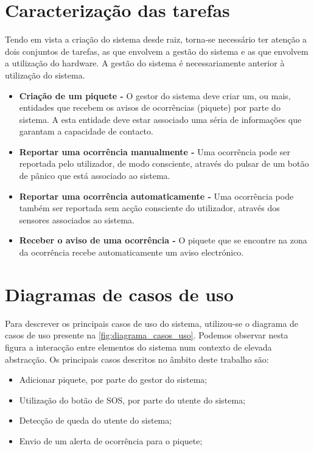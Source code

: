 \section{Caracterização das tarefas}

Tendo em vista a criação do sistema desde raiz, torna-se necessário ter atenção a dois conjuntos de tarefas, as que envolvem a gestão do sistema e as que envolvem a utilização do hardware. A gestão do sistema é necessariamente anterior à utilização do sistema.
\begin{itemize}
	\item\textbf{Criação de um piquete -} O gestor do sistema deve criar um, ou mais, entidades que recebem os avisos de ocorrências (piquete) por parte do sistema. A esta entidade deve estar associado uma séria de informações que garantam a capacidade de contacto. 
	
	\item\textbf{Reportar uma ocorrência manualmente -} Uma ocorrência pode ser reportada pelo utilizador, de modo consciente, através do pulsar de um botão de pânico que está associado ao sistema.
	
	\item\textbf{Reportar uma ocorrência automaticamente -} Uma ocorrência pode também ser reportada sem acção consciente do utilizador, através dos sensores associados ao sistema. 
	
	\item\textbf{Receber o aviso de uma ocorrência -} O piquete que se encontre na zona da ocorrência recebe automaticamente um aviso electrónico.
	
\end{itemize}

\section{Diagramas de casos de uso}

Para descrever os principais casos de uso do sistema, utilizou-se o diagrama de casos de uso presente na \ref{fig:diagrama_casos_uso}. Podemos observar nesta figura a interacção entre elementos do sistema num contexto de
elevada abstracção. Os principais casos descritos no âmbito deste trabalho são:
\begin{itemize}
	\item Adicionar piquete, por parte do gestor do sistema;
	\item Utilização do botão de SOS, por parte do utente do sistema;
	\item Detecção de queda do utente do sistema;
	\item Envio de um alerta de ocorrência para o piquete;
\end{itemize}

